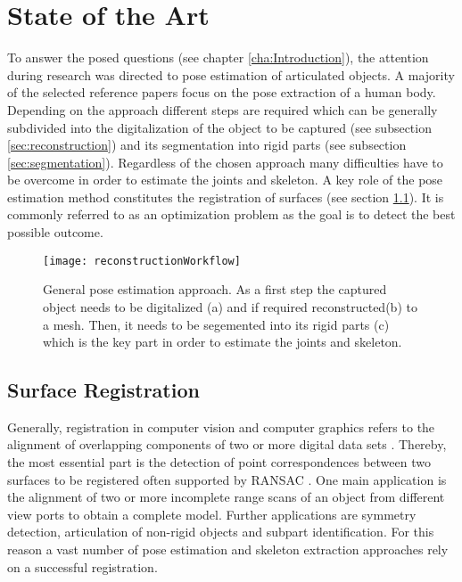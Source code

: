 \chapter{State of the Art}
\label{cha:StateOfTheArt}

To answer the posed questions (see chapter \ref{cha:Introduction}), the attention during research was directed to pose estimation of articulated objects. A majority of the selected reference papers focus on the pose extraction of a human body. Depending on the approach different steps are required which can be generally subdivided into the digitalization of the object to be captured (see subsection \ref{sec:reconstruction}) and its segmentation into rigid parts (see subsection \ref{sec:segmentation}). Regardless of the chosen approach many difficulties have to be overcome in order to estimate the joints and skeleton. A key role of the pose estimation method constitutes the registration of surfaces (see section \ref{registration}). It is commonly referred to as an optimization problem as the goal is to detect the best possible outcome.
%
\begin{figure}[H]
	\centering
	\texttt{[image: reconstructionWorkflow]}
	\caption{General pose estimation approach. As a first step the captured object needs to be digitalized (a) and if required reconstructed(b) to a mesh. Then, it needs to be segemented into its rigid parts (c) which is the key part in order to estimate the joints and skeleton.}
	\label{fig:posecapture}
\end{figure}
%
%
\section{Surface Registration}
\label{registration}
Generally, registration in computer vision and computer graphics refers to the alignment of overlapping components of two or more digital data sets \cite{survey}. Thereby, the most essential part is the detection of point correspondences between two surfaces to be registered often supported by RANSAC \cite{ransac}. One main application is the alignment of two or more incomplete range scans of an object from different view ports to obtain a complete model. Further applications are symmetry detection, articulation of non-rigid objects and subpart identification. For this reason a vast number of pose estimation and skeleton extraction approaches rely on a successful registration. 

